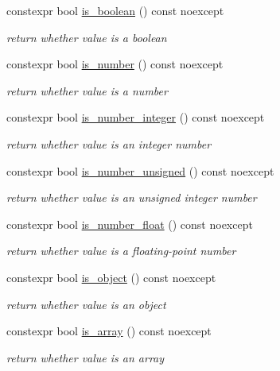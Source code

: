 \begin{DoxyCompactItemize}
constexpr bool \mbox{\hyperlink{classnlohmann_1_1basic__json_a943e8cb182d0f2365c76d64b42eaa6fd}{is\+\_\+boolean}} () const noexcept
\begin{DoxyCompactList}\small\item\em return whether value is a boolean \end{DoxyCompactList}\item 
constexpr bool \mbox{\hyperlink{classnlohmann_1_1basic__json_a2b9852390abb4b1ef5fac6984e2fc0f3}{is\+\_\+number}} () const noexcept
\begin{DoxyCompactList}\small\item\em return whether value is a number \end{DoxyCompactList}\item 
constexpr bool \mbox{\hyperlink{classnlohmann_1_1basic__json_abac8af76067f1e8fdca9052882c74428}{is\+\_\+number\+\_\+integer}} () const noexcept
\begin{DoxyCompactList}\small\item\em return whether value is an integer number \end{DoxyCompactList}\item 
constexpr bool \mbox{\hyperlink{classnlohmann_1_1basic__json_abc7378cba0613a78b9aad1c8e7044bb0}{is\+\_\+number\+\_\+unsigned}} () const noexcept
\begin{DoxyCompactList}\small\item\em return whether value is an unsigned integer number \end{DoxyCompactList}\item 
constexpr bool \mbox{\hyperlink{classnlohmann_1_1basic__json_a33b4bf898b857c962e798fc7f6e86e70}{is\+\_\+number\+\_\+float}} () const noexcept
\begin{DoxyCompactList}\small\item\em return whether value is a floating-\/point number \end{DoxyCompactList}\item 
constexpr bool \mbox{\hyperlink{classnlohmann_1_1basic__json_af8f511af124e82e4579f444b4175787c}{is\+\_\+object}} () const noexcept
\begin{DoxyCompactList}\small\item\em return whether value is an object \end{DoxyCompactList}\item 
constexpr bool \mbox{\hyperlink{classnlohmann_1_1basic__json_aef9ce5dd2381caee1f8ddcdb5bdd9c65}{is\+\_\+array}} () const noexcept
\begin{DoxyCompactList}\small\item\em return whether value is an array \end{DoxyCompactList}\item 

\end{DoxyCompactItemize}

